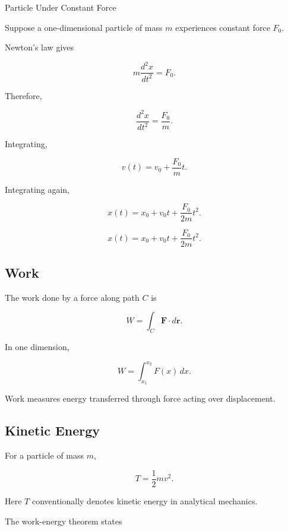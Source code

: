 \begin{workedexamplebox}{Particle Under Constant Force}

Suppose a one-dimensional particle of mass \(m\) experiences constant force
\(F_0\).

Newton's law gives

\[
m\frac{d^2x}{dt^2}
=
F_0.
\]

Therefore,

\[
\frac{d^2x}{dt^2}
=
\frac{F_0}{m}.
\]

Integrating,

\[
v(t)
=
v_0
+
\frac{F_0}{m}t.
\]

Integrating again,

\[
x(t)
=
x_0
+
v_0t
+
\frac{F_0}{2m}t^2.
\]

\begin{answerbox}
\[
\boxed{
x(t)
=
x_0
+
v_0t
+
\frac{F_0}{2m}t^2.
}
\]
\end{answerbox}

\end{workedexamplebox}

\subsection{Work}
\label{subsec:physical-work}

The work done by a force along path \(C\) is

\[
\boxed{
W
=
\int_C
\mathbf{F}\cdot d\mathbf{r}.
}
\]

In one dimension,

\[
\boxed{
W
=
\int_{x_1}^{x_2}
F(x)\,dx.
}
\]

Work measures energy transferred through force acting over displacement.

\subsection{Kinetic Energy}
\label{subsec:kinetic-energy}

For a particle of mass \(m\),

\[
\boxed{
T
=
\frac12mv^2.
}
\]

Here \(T\) conventionally denotes kinetic energy in analytical mechanics.

The work-energy theorem states

